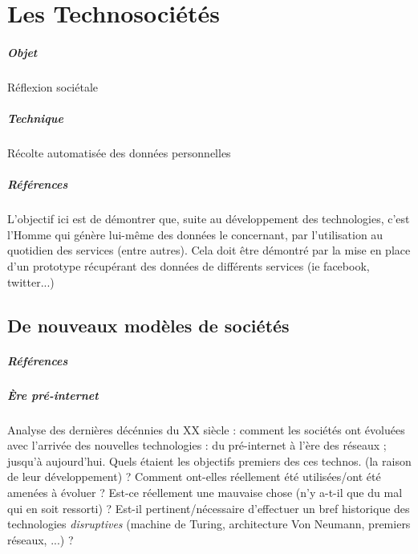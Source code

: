 \chapter{Les Technosociétés}
\paragraph{Objet} Réflexion sociétale
\paragraph{Technique} Récolte automatisée des données personnelles
\paragraph{Références}
\cite{Damasio:0}
\cite{Damasio:1}
\cite{Deleuze:0}
\cite{Foucault:0}
\cite{Huxley:0}
\cite{Klein:0}
\cite{Marx:0}
\cite{Marx:1}
\cite{Moore:0}
\cite{Negri:0}
\cite{Nietzsche:0}
\cite{Orwell:0}
\cite{Pieces:0}
\cite{Rabhi:0}
\cite{Rufin:0}
\cite{Arte:0}
\cite{GhostInTheShell}
\cite{Gunnm}
\cite{PsychoPass}

L'objectif ici est de démontrer que, suite au développement des technologies, c'est l'Homme
qui génère lui-même des données le concernant, par l'utilisation au quotidien des services (entre autres).
Cela doit être démontré par la mise en place d'un prototype récupérant des données de différents
services (ie facebook, twitter...)

\section{De nouveaux modèles de sociétés}
\paragraph{Références} \cite{Marx:0} \cite{Marx:1} \cite{Nietzsche:0}

\paragraph{Ère pré-internet} Analyse des dernières décénnies du XX siècle :
comment les sociétés ont évoluées avec l'arrivée des nouvelles technologies : du
pré-internet à l'ère des réseaux ; jusqu'à aujourd'hui. Quels étaient les objectifs
premiers des ces technos. (la raison de leur développement) ? Comment ont-elles réellement
 été utilisées/ont été amenées à évoluer ? Est-ce réellement une mauvaise chose (n'y
 a-t-il que du mal qui en soit ressorti) ? Est-il pertinent/nécessaire d'effectuer un bref
 historique des technologies \emph{disruptives} (machine de Turing, architecture
 Von Neumann, premiers réseaux, ...) ?

